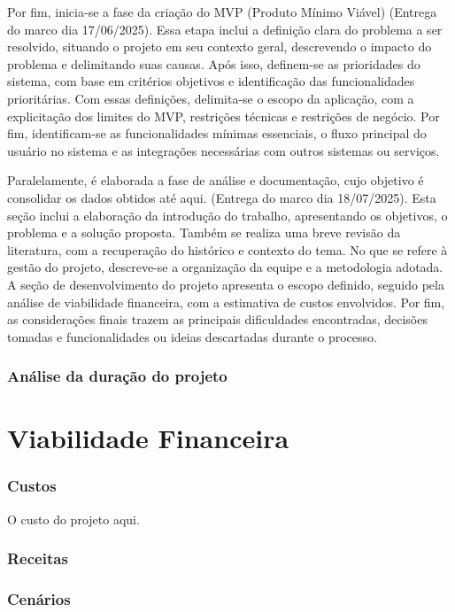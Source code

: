 \documentclass[
	12pt,				%
	openany,			%
	twoside,			%
	a4paper,			%
	english,			%
	brazil				%
	]{abntex2}
\begin{document}
Por fim, inicia-se a fase da criação do MVP (Produto Mínimo Viável) (Entrega do marco dia 17/06/2025). Essa etapa inclui a definição clara do problema a ser resolvido, situando o projeto em seu contexto geral, descrevendo o impacto do problema e delimitando suas causas. Após isso, definem-se as prioridades do sistema, com base em critérios objetivos e identificação das funcionalidades prioritárias. Com essas definições, delimita-se o escopo da aplicação, com a explicitação dos limites do MVP, restrições técnicas e restrições de negócio. Por fim, identificam-se as funcionalidades mínimas essenciais, o fluxo principal do usuário no sistema e as integrações necessárias com outros sistemas ou serviços.

Paralelamente, é elaborada a fase de análise e documentação, cujo objetivo é consolidar os dados obtidos até aqui. (Entrega do marco dia 18/07/2025). Esta seção inclui a elaboração da introdução do trabalho, apresentando os objetivos, o problema e a solução proposta. Também se realiza uma breve revisão da literatura, com a recuperação do histórico e contexto do tema. No que se refere à gestão do projeto, descreve-se a organização da equipe e a metodologia adotada. A seção de desenvolvimento do projeto apresenta o escopo definido, seguido pela análise de viabilidade financeira, com a estimativa de custos envolvidos. Por fim, as considerações finais trazem as principais dificuldades encontradas, decisões tomadas e funcionalidades ou ideias descartadas durante o processo.

\subsection{Análise da duração do projeto}

\chapter{Viabilidade Financeira}

\subsection{Custos}
O custo do projeto aqui.

\subsection{Receitas}

\subsection{Cenários}
\end{document}
